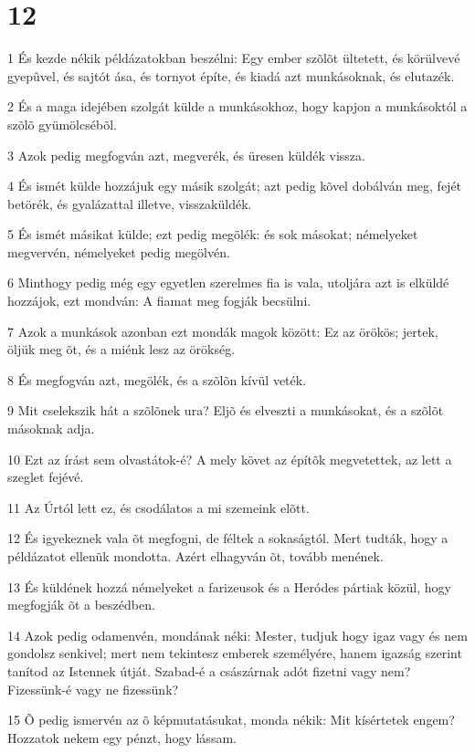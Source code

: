 \chapter{12}

\par 1 És kezde nékik példázatokban beszélni: Egy ember  szõlõt ültetett, és körülvevé gyepûvel, és sajtót ása, és tornyot építe, és kiadá azt munkásoknak, és elutazék.
\par 2 És a maga idejében szolgát külde a munkásokhoz, hogy kapjon a munkásoktól a szõlõ gyümölcsébõl.
\par 3 Azok pedig megfogván azt, megverék, és üresen küldék vissza.
\par 4 És ismét külde hozzájuk egy másik szolgát; azt pedig kõvel dobálván meg, fejét betörék, és gyalázattal illetve, visszaküldék.
\par 5 És ismét másikat külde; ezt pedig megölék: és sok másokat; némelyeket megvervén, némelyeket pedig megölvén.
\par 6 Minthogy pedig még egy egyetlen szerelmes fia is vala, utoljára azt is elküldé hozzájok, ezt mondván: A fiamat meg fogják becsülni.
\par 7 Azok a munkások azonban ezt mondák magok között: Ez az örökös; jertek, öljük meg õt, és a miénk lesz az örökség.
\par 8 És megfogván azt, megölék, és a szõlõn kívül veték.
\par 9 Mit cselekszik hát a szõlõnek ura? Eljõ és elveszti a munkásokat, és a szõlõt másoknak adja.
\par 10 Ezt az írást sem olvastátok-é? A mely követ az építõk megvetettek, az lett a szeglet fejévé.
\par 11 Az Úrtól lett ez, és csodálatos a mi szemeink elõtt.
\par 12 És igyekeznek vala õt megfogni, de féltek a sokaságtól. Mert tudták, hogy a példázatot ellenük mondotta. Azért elhagyván õt, tovább menének.
\par 13 És küldének hozzá némelyeket a farizeusok és a Heródes pártiak közül, hogy megfogják õt a beszédben.
\par 14 Azok pedig odamenvén, mondának néki: Mester, tudjuk hogy igaz vagy és nem gondolsz senkivel; mert nem tekintesz emberek személyére, hanem igazság szerint tanítod az Istennek útját. Szabad-é a császárnak adót fizetni vagy nem? Fizessünk-é vagy ne fizessünk?
\par 15 Õ pedig ismervén az õ képmutatásukat, monda nékik: Mit kísértetek engem? Hozzatok nekem egy pénzt, hogy lássam.
